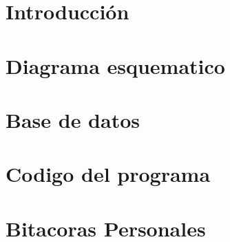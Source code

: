 \documentclass{article}
\begin{document}
\section{Introducción}

\section{Diagrama esquematico}

\section{Base de datos}

\section{Codigo del programa}

\section{Bitacoras Personales}

\end{document}
